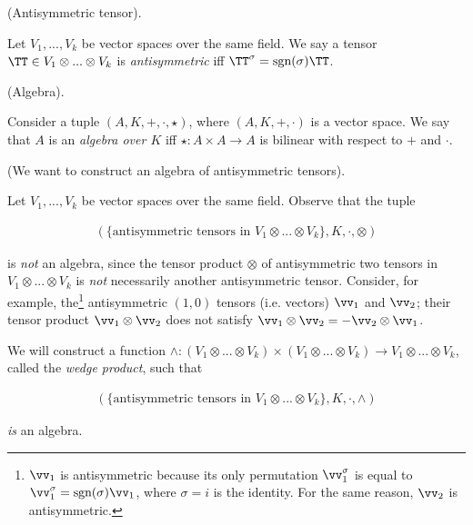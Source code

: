 \begin{defn}
\label{ch::exterior_pwrs::defn::antisymmetric_tensor}
    (Antisymmetric tensor). 
    
    Let $V_1, ..., V_k$ be vector spaces over the same field. We say a tensor $\TT \in V_1 \otimes ... \otimes V_k$ is \textit{antisymmetric} iff $\TT^\sigma = \sgn(\sigma) \TT$.
\end{defn}

\begin{defn}
    (Algebra).
    
    Consider a tuple $(A, K, +, \cdot, \star)$, where $(A, K, +, \cdot)$ is a vector space. We say that $A$ is an \textit{algebra over $K$} iff $\star:A \times A \rightarrow A$ is bilinear with respect to $+$ and $\cdot$.
\end{defn}

\begin{remark}
\label{ch::exterior_pwrs::rmk::want_antisymmetric_algebra}
    (We want to construct an algebra of antisymmetric tensors).
    
    Let $V_1, ..., V_k$ be vector spaces over the same field. Observe that the tuple
    
    \begin{align*}
        (\{\text{antisymmetric tensors in $V_1 \otimes ... \otimes V_k$}\}, K, \cdot, \otimes )
    \end{align*}
    
    is \textit{not} an algebra, since the tensor product $\otimes$ of antisymmetric two tensors in $V_1 \otimes ... \otimes V_k$ is \textit{not} necessarily another antisymmetric tensor. Consider, for example, the\footnote{$\vv_1$ is antisymmetric because its only permutation $\vv_1^\sigma$ is equal to $\vv_1^\sigma = \sgn(\sigma) \vv_1$, where $\sigma = i$ is the identity. For the same reason, $\vv_2$ is antisymmetric.} antisymmetric $(1, 0)$ tensors (i.e. vectors) $\vv_1$ and $\vv_2$; their tensor product $\vv_1 \otimes \vv_2$ does not satisfy $\vv_1 \otimes \vv_2 = -\vv_2 \otimes \vv_1$.
    
    We will construct a function $\wedge:(V_1 \otimes ... \otimes V_k) \times (V_1 \otimes ... \otimes V_k) \rightarrow V_1 \otimes ... \otimes V_k$, called the \textit{wedge product}, such that 
    
    \begin{align*}
        (\{\text{antisymmetric tensors in $V_1 \otimes ... \otimes V_k$}\}, K, \cdot, \wedge )
    \end{align*}
    
    \textit{is} an algebra.
\end{remark}

